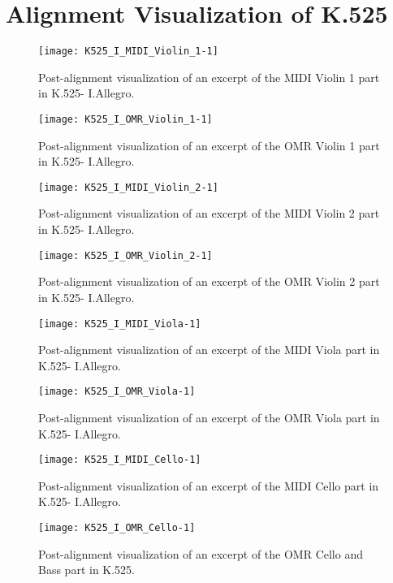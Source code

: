 \chapter{Alignment Visualization of K.525}\label{appa}
\clearpage

\begin{figure}[H]
\centering
\texttt{[image: K525\_I\_MIDI\_Violin\_1-1]}
\caption[K.525- I.Allegro MIDI Violin 1 alignment]{Post-alignment visualization of an excerpt of the MIDI Violin 1 part in K.525- I.Allegro.}
\end{figure}

\begin{figure}[H]
\centering
\texttt{[image: K525\_I\_OMR\_Violin\_1-1]}
\caption[K.525- I.Allegro OMR Violin 1 alignment]{Post-alignment visualization of an excerpt of the OMR Violin 1 part in K.525- I.Allegro.}
\end{figure}

\begin{figure}[H]
\centering
\texttt{[image: K525\_I\_MIDI\_Violin\_2-1]}
\caption[K.525- I.Allegro MIDI Violin 2 alignment]{Post-alignment visualization of an excerpt of the MIDI Violin 2 part in K.525- I.Allegro.}
\end{figure}

\begin{figure}[H]
\centering
\texttt{[image: K525\_I\_OMR\_Violin\_2-1]}
\caption[K.525- I.Allegro OMR Violin 2 alignment]{Post-alignment visualization of an excerpt of the OMR Violin 2 part in K.525- I.Allegro.}
\end{figure}

\begin{figure}[H]
\centering
\texttt{[image: K525\_I\_MIDI\_Viola-1]}
\caption[K.525- I.Allegro MIDI Viola alignment]{Post-alignment visualization of an excerpt of the MIDI Viola part in K.525- I.Allegro.}
\end{figure}

\begin{figure}[H]
\centering
\texttt{[image: K525\_I\_OMR\_Viola-1]}
\caption[K.525- I.Allegro OMR Viola alignment]{Post-alignment visualization of an excerpt of the OMR Viola part in K.525- I.Allegro.}
\end{figure}

\begin{figure}[H]
\centering
\texttt{[image: K525\_I\_MIDI\_Cello-1]}
\caption[K.525- I.Allegro MIDI Cello alignment]{Post-alignment visualization of an excerpt of the MIDI Cello part in K.525- I.Allegro.}
\end{figure}

\begin{figure}[H]
\centering
\texttt{[image: K525\_I\_OMR\_Cello-1]}
\caption[K.525- I.Allegro OMR Cello alignment]{Post-alignment visualization of an excerpt of the OMR Cello and Bass part in K.525.}
\end{figure}


\clearpage
\newpage
